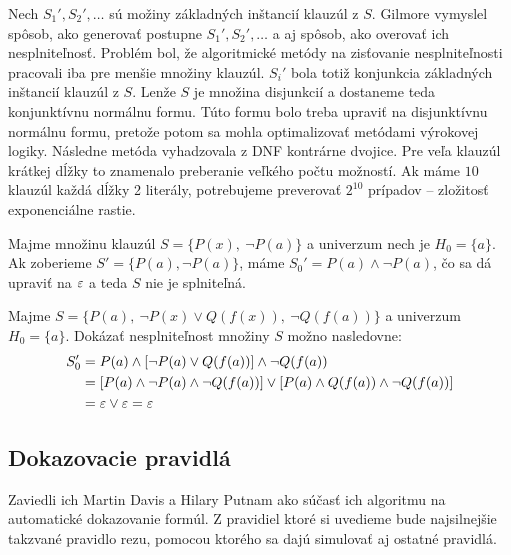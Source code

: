 \begin{poznamka}[Gilmore, 1960]
    Nech $S_1',S_2',\dots$ sú možiny základných inštancií klauzúl z
    $S$. Gilmore vymyslel spôsob, ako generovať postupne
    $S_1',S_2',\dots$ a aj spôsob, ako overovať ich nesplniteľnosť.
    Problém bol, že algoritmické metódy na zisťovanie nesplniteľnosti
    pracovali iba pre menšie množiny klauzúl.
    $S_i'$ bola totiž konjunkcia základných inštancií klauzúl z $S$.
    Lenže $S$ je množina disjunkcií a dostaneme teda
    konjunktívnu normálnu formu. Túto formu bolo treba upraviť na
    disjunktívnu normálnu formu, pretože potom sa mohla optimalizovať
    metódami výrokovej logiky. Následne metóda vyhadzovala z DNF
    kontrárne dvojice.
    Pre veľa klauzúl krátkej dĺžky to znamenalo preberanie veľkého
    počtu možností.
    Ak máme $10$ klauzúl každá dĺžky 2 literály,
    potrebujeme preverovať $2^{10}$ prípadov -- zložitosť exponenciálne
    rastie.
\end{poznamka}

\begin{priklad}
    Majme množinu klauzúl $S=\{P(x),\ \neg P(a)\}$ a
    univerzum nech je $H_0 = \{a\}$.
    Ak zoberieme $S'=\{P(a), \neg P(a)\}$,
    máme $S_0' = P(a) \land \neg P(a)$, čo sa dá upraviť na $\varepsilon$ a
    teda $S$ nie je splniteľná.
\end{priklad}


\begin{priklad}
    Majme $S=\{P(a),\ \neg P(x) \lor Q(f(x)),\ \neg Q(f(a)) \}$ a
    univerzum $H_0 = \{a\}$.
    Dokázať nesplniteľnost množiny $S$ možno nasledovne:
    \begin{equation*}
    \begin{split}
        S_0' &=P(a)\land [\neg P(a)\lor Q(f(a))] \land \neg Q(f(a)) \\
             &=[P(a)\land \neg P(a) \land \neg Q(f(a))] \lor 
               [P(a) \land Q(f(a)) \land \neg Q(f(a))] \\
             &= \varepsilon \lor \varepsilon = \varepsilon
    \end{split}
    \end{equation*}
\end{priklad}

\subsection{Dokazovacie pravidlá}

Zaviedli ich Martin Davis a Hilary Putnam ako súčasť ich algoritmu na
automatické dokazovanie formúl. Z pravidiel ktoré si uvedieme bude
najsilnejšie takzvané pravidlo rezu, pomocou ktorého sa dajú simulovať
aj ostatné pravidlá.

